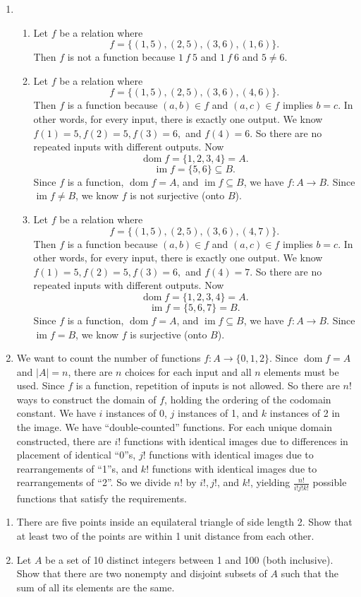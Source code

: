 \documentclass{article}
\DeclareMathOperator{\dom}{dom}
\DeclareMathOperator{\im}{im}
\theoremstyle{definition}
\begin{document}
\begin{solution}
\begin{enumerate}
    \item\begin{enumerate}
    \item Let $f$ be a relation where \[f=\{(1,5),(2,5),(3,6),(1,6)\}.\] Then $f$ is not a function because $1~f~5$ and $1~f~6$ and $5\neq 6$.
    \item Let $f$ be a relation where \[f=\{(1,5),(2,5),(3,6),(4,6)\}.\] Then $f$ is a function because $(a,b)\in f$ and $(a,c)\in f$ implies $b=c$. In other words, for every input, there is exactly one output. We know $f(1)=5,f(2)=5,f(3)=6,$ and $f(4)=6$. So there are no repeated inputs with different outputs. Now \[\dom{f}=\{1,2,3,4\}=A.\] \[\im{f}=\{5,6\}\subseteq B.\] Since $f$ is a function, $\dom{f}=A$, and $\im{f}\subseteq B$, we have $f:A\to B$. Since $\im{f}\neq B$, we know $f$ is not surjective (onto $B$).
    \item Let $f$ be a relation where \[f=\{(1,5),(2,5),(3,6),(4,7)\}.\] Then $f$ is a function because $(a,b)\in f$ and $(a,c)\in f$ implies $b=c$. In other words, for every input, there is exactly one output. We know $f(1)=5,f(2)=5,f(3)=6,$ and $f(4)=7$. So there are no repeated inputs with different outputs. Now \[\dom{f}=\{1,2,3,4\}=A.\] \[\im{f}=\{5,6,7\}=B.\] Since $f$ is a function, $\dom{f}=A$, and $\im{f}\subseteq B$, we have $f:A\to B$. Since $\im{f}=B$, we know $f$ is surjective (onto $B$).
    \end{enumerate}
    \item We want to count the number of functions $f:A\to\{0,1,2\}$. Since $\dom{f}=A$ and $|A|=n$, there are $n$ choices for each input and all $n$ elements must be used. Since $f$ is a function, repetition of inputs is not allowed. So there are $n!$ ways to construct the domain of $f$, holding the ordering of the codomain constant. We have $i$ instances of 0, $j$ instances of 1, and $k$ instances of 2 in the image. We have ``double-counted'' functions. For each unique domain constructed, there are $i!$ functions with identical images due to differences in placement of identical ``0''s, $j!$ functions with identical images due to rearrangements of ``1''s, and $k!$ functions with identical images due to rearrangements of ``2''. So we divide $n!$ by $i!,j!$, and $k!$, yielding $\frac{n!}{i!j!k!}$ possible functions that satisfy the requirements.
\end{enumerate}
\end{solution}
\begin{question}
    \begin{enumerate}
	\item There are five points inside an equilateral triangle of side length 2. 
	Show that at least two of the points are within 1 unit distance from each other.
	\item Let $A$ be a set of 10 distinct integers between 1 and 100 (both inclusive). 
	Show that there are two nonempty and disjoint subsets of $A$ such that the sum of all its elements are the same.
    \end{enumerate}
\end{question}
\end{document}
